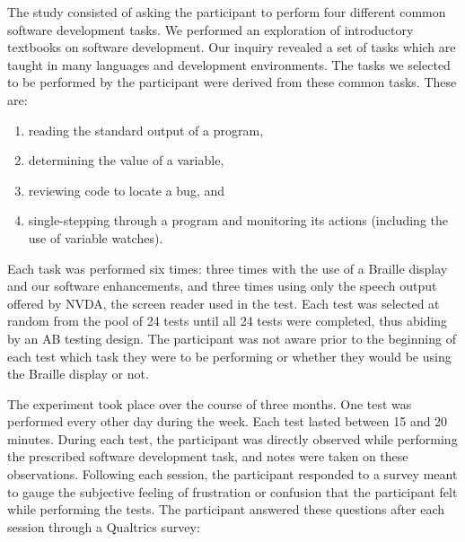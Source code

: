 \documentclass[11.5pt]{sig-alternate} %
\begin{document}
\begin{large}
The study consisted of asking the participant to perform four different common software development tasks. We performed an exploration of introductory textbooks on software development. Our inquiry revealed a set of tasks which are taught in many languages and development environments. The tasks we selected to be performed by the participant were derived from these common tasks. These are:
\begin{enumerate}
    \item reading the standard output of a program,
    \item determining the value of a variable,
    \item reviewing code to locate a bug, and
    \item single-stepping through a program and monitoring its actions (including the use of variable watches).
\end{enumerate}

Each task was performed six times: three times with the use of a Braille display and our software enhancements, and three times using only the speech output offered by NVDA, the screen reader used in the test. Each test was selected at random from the pool of 24 tests until all 24 tests were completed, thus abiding by an AB testing design. The participant was not aware prior to the beginning of each test which task they were to be performing or whether they would be using the Braille display or not.

The experiment took place over the course of three months. One test was performed every other day during the week. Each test lasted between 15 and 20 minutes. During each test, the participant was directly observed while performing the prescribed software development task, and notes were taken on these observations. Following each session, the participant responded to a survey meant to gauge the subjective feeling of frustration or confusion that the participant felt while performing the tests. The participant answered these questions after each session through a Qualtrics survey:


\end{large}
\end{document}
